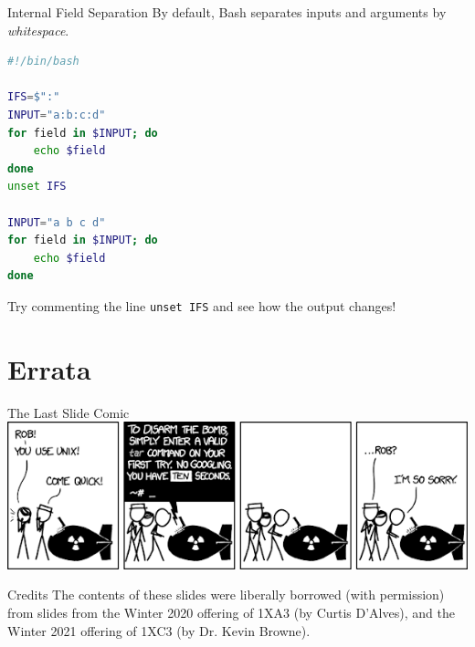 \documentclass[11pt]{beamer}
\begin{document}
\begin{frame}[fragile=singleslide]{Internal Field Separation}
By default, Bash separates inputs and arguments by \emph{whitespace}.
\begin{lstlisting}[style=terminal, language=bash]
#!/bin/bash

IFS=$":"
INPUT="a:b:c:d"
for field in $INPUT; do
    echo $field
done
unset IFS

INPUT="a b c d"
for field in $INPUT; do
    echo $field
done
\end{lstlisting}

Try commenting the line \texttt{unset IFS} and see how the output changes! 
\end{frame}

\section[Errata]{Errata}
\begin{frame}{The Last Slide Comic}
\center
\includegraphics[scale=0.5]{tar.png}
\end{frame}

\begin{frame}{Credits}
\center
\vspace{8em}
The contents of these slides were liberally borrowed (with permission) from slides from the Winter 2020 offering of 1XA3 (by Curtis D'Alves), and the Winter 2021 offering of 1XC3 (by Dr. Kevin Browne).  
\end{frame}
\end{document}
